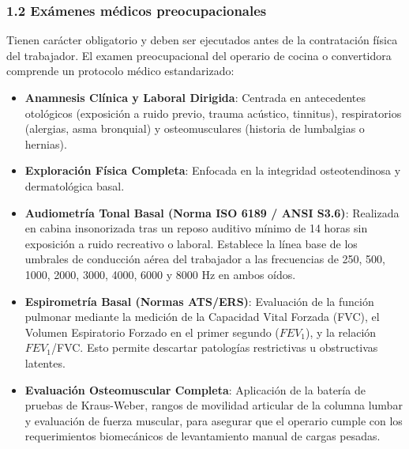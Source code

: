 \documentclass[11pt, letterpaper]{article}
\begin{document}
\subsubsection{1.2 Exámenes médicos preocupacionales}
Tienen carácter obligatorio y deben ser ejecutados antes de la contratación física del trabajador. El examen preocupacional del operario de cocina o convertidora comprende un protocolo médico estandarizado:
\begin{itemize}
    \item \textbf{Anamnesis Clínica y Laboral Dirigida}: Centrada en antecedentes otológicos (exposición a ruido previo, trauma acústico, tinnitus), respiratorios (alergias, asma bronquial) y osteomusculares (historia de lumbalgias o hernias).
    \item \textbf{Exploración Física Completa}: Enfocada en la integridad osteotendinosa y dermatológica basal.
    \item \textbf{Audiometría Tonal Basal (Norma ISO 6189 / ANSI S3.6)}: Realizada en cabina insonorizada tras un reposo auditivo mínimo de 14 horas sin exposición a ruido recreativo o laboral. Establece la línea base de los umbrales de conducción aérea del trabajador a las frecuencias de 250, 500, 1000, 2000, 3000, 4000, 6000 y 8000 Hz en ambos oídos.
    \item \textbf{Espirometría Basal (Normas ATS/ERS)}: Evaluación de la función pulmonar mediante la medición de la Capacidad Vital Forzada (FVC), el Volumen Espiratorio Forzado en el primer segundo ($FEV_1$), y la relación $FEV_1$/FVC. Esto permite descartar patologías restrictivas u obstructivas latentes.
    \item \textbf{Evaluación Osteomuscular Completa}: Aplicación de la batería de pruebas de Kraus-Weber, rangos de movilidad articular de la columna lumbar y evaluación de fuerza muscular, para asegurar que el operario cumple con los requerimientos biomecánicos de levantamiento manual de cargas pesadas.
\end{itemize}
\end{document}
